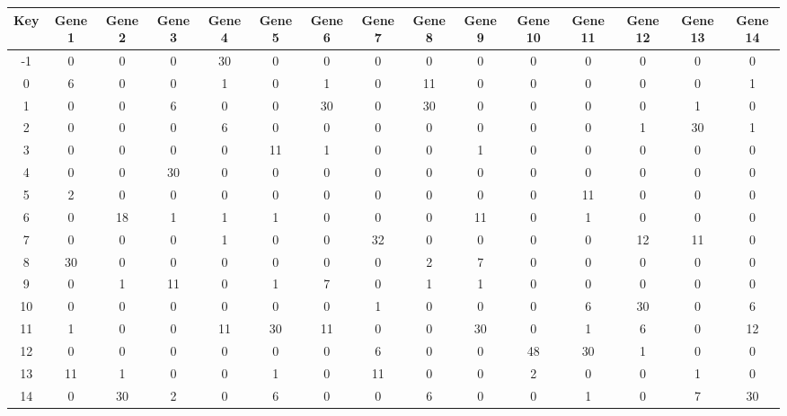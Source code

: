 \begin{tabular}{|c|c|c|c|c|c|c|c|c|c|c|c|c|c|c|}
\hline
Key & Gene 1 & Gene 2 & Gene 3 & Gene 4 & Gene 5 & Gene 6 & Gene 7 & Gene 8 & Gene 9 & Gene 10 & Gene 11 & Gene 12 & Gene 13 & Gene 14 \\
\hline
-1 & 0 & 0 & 0 & 30 & 0 & 0 & 0 & 0 & 0 & 0 & 0 & 0 & 0 & 0 \\
0 & 6 & 0 & 0 & 1 & 0 & 1 & 0 & 11 & 0 & 0 & 0 & 0 & 0 & 1 \\
1 & 0 & 0 & 6 & 0 & 0 & 30 & 0 & 30 & 0 & 0 & 0 & 0 & 1 & 0 \\
2 & 0 & 0 & 0 & 6 & 0 & 0 & 0 & 0 & 0 & 0 & 0 & 1 & 30 & 1 \\
3 & 0 & 0 & 0 & 0 & 11 & 1 & 0 & 0 & 1 & 0 & 0 & 0 & 0 & 0 \\
4 & 0 & 0 & 30 & 0 & 0 & 0 & 0 & 0 & 0 & 0 & 0 & 0 & 0 & 0 \\
5 & 2 & 0 & 0 & 0 & 0 & 0 & 0 & 0 & 0 & 0 & 11 & 0 & 0 & 0 \\
6 & 0 & 18 & 1 & 1 & 1 & 0 & 0 & 0 & 11 & 0 & 1 & 0 & 0 & 0 \\
7 & 0 & 0 & 0 & 1 & 0 & 0 & 32 & 0 & 0 & 0 & 0 & 12 & 11 & 0 \\
8 & 30 & 0 & 0 & 0 & 0 & 0 & 0 & 2 & 7 & 0 & 0 & 0 & 0 & 0 \\
9 & 0 & 1 & 11 & 0 & 1 & 7 & 0 & 1 & 1 & 0 & 0 & 0 & 0 & 0 \\
10 & 0 & 0 & 0 & 0 & 0 & 0 & 1 & 0 & 0 & 0 & 6 & 30 & 0 & 6 \\
11 & 1 & 0 & 0 & 11 & 30 & 11 & 0 & 0 & 30 & 0 & 1 & 6 & 0 & 12 \\
12 & 0 & 0 & 0 & 0 & 0 & 0 & 6 & 0 & 0 & 48 & 30 & 1 & 0 & 0 \\
13 & 11 & 1 & 0 & 0 & 1 & 0 & 11 & 0 & 0 & 2 & 0 & 0 & 1 & 0 \\
14 & 0 & 30 & 2 & 0 & 6 & 0 & 0 & 6 & 0 & 0 & 1 & 0 & 7 & 30 \\
\hline
\end{tabular}